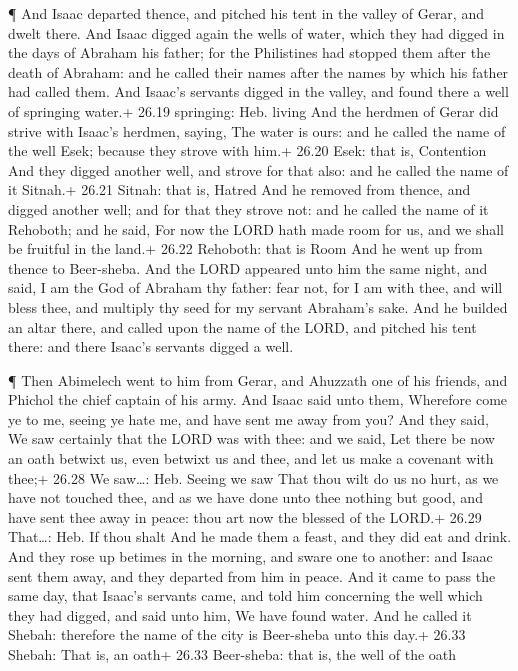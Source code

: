  ¶ And Isaac departed thence, and pitched his tent in the
valley of Gerar, and dwelt there.  And Isaac digged again
the wells of water, which they had digged in the days of Abraham his
father; for the Philistines had stopped them after the death of Abraham:
and he called their names after the names by which his father had called
them.  And Isaac's servants digged in the valley, and found
there a well of springing water.+ 26.19 springing: Heb. living
 And the herdmen of Gerar did strive with Isaac's herdmen,
saying, The water is ours: and he called the name of the well Esek;
because they strove with him.+ 26.20 Esek: that is, Contention
 And they digged another well, and strove for that also:
and he called the name of it Sitnah.+ 26.21 Sitnah: that is, Hatred
 And he removed from thence, and digged another well; and
for that they strove not: and he called the name of it Rehoboth; and he
said, For now the LORD hath made room for us, and we shall be fruitful
in the land.+ 26.22 Rehoboth: that is Room  And he went up
from thence to Beer-sheba.  And the LORD appeared unto him
the same night, and said, I am the God of Abraham thy father: fear not,
for I am with thee, and will bless thee, and multiply thy seed for my
servant Abraham's sake.  And he builded an altar there, and
called upon the name of the LORD, and pitched his tent there: and there
Isaac's servants digged a well.

 ¶ Then Abimelech went to him from Gerar, and Ahuzzath one
of his friends, and Phichol the chief captain of his army. 
And Isaac said unto them, Wherefore come ye to me, seeing ye hate me,
and have sent me away from you?  And they said, We saw
certainly that the LORD was with thee: and we said, Let there be now an
oath betwixt us, even betwixt us and thee, and let us make a covenant
with thee;+ 26.28 We saw\ldots: Heb. Seeing we saw  That
thou wilt do us no hurt, as we have not touched thee, and as we have
done unto thee nothing but good, and have sent thee away in peace: thou
art now the blessed of the LORD.+ 26.29 That\ldots: Heb. If thou shalt
 And he made them a feast, and they did eat and drink.
 And they rose up betimes in the morning, and sware one to
another: and Isaac sent them away, and they departed from him in peace.
 And it came to pass the same day, that Isaac's servants
came, and told him concerning the well which they had digged, and said
unto him, We have found water.  And he called it Shebah:
therefore the name of the city is Beer-sheba unto this day.+ 26.33
Shebah: That is, an oath+ 26.33 Beer-sheba: that is, the well of the
oath


